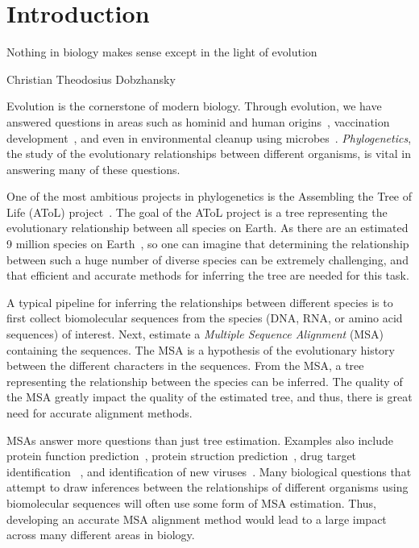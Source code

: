 \chapter{Introduction}\label{intro}
%
\epigraph{Nothing in biology makes sense except in the light of evolution}{Christian Theodosius Dobzhansky}

Evolution is the cornerstone of modern biology.  Through evolution, we have answered questions in areas such as hominid and human origins~\cite{Martin1990,Takahata1997}, vaccination development~\cite{Wilder-Smith2010,Fitch1993}, and even in environmental cleanup using microbes~\cite{Liu1993}.  \emph{Phylogenetics}, the study of the evolutionary relationships between different organisms, is vital in answering many of these questions.  

One of the most ambitious projects in phylogenetics is the Assembling the Tree of Life (AToL) project~\cite{atol-website}.  The goal of the AToL project is a tree representing the evolutionary relationship between all species on Earth.  As there are an estimated 9 million species on Earth~\cite{Mora2011}, so one can imagine that determining the relationship between such a huge number of diverse species can be extremely challenging, and that efficient and accurate methods for inferring the tree are needed for this task.  

A typical pipeline for inferring the relationships between different species is to first collect biomolecular sequences from the species (DNA, RNA, or amino acid sequences) of interest.  Next, estimate a \emph{Multiple Sequence Alignment} (MSA) containing the sequences.  The MSA is a hypothesis of the evolutionary history between the different characters in the sequences.  From the MSA, a tree representing the relationship between the species can be inferred.  The quality of the MSA greatly impact the quality of the estimated tree, and thus, there is great need for accurate alignment methods.

MSAs answer more questions than just tree estimation.  Examples also include protein function prediction~\cite{Pei2008}, protein struction prediction~\cite{todo}, drug target identification~ \cite{Abadio2011}, and identification of new viruses~\cite{todo}.  Many biological questions that attempt to draw inferences between the relationships of different organisms using biomolecular sequences will often use some form of MSA estimation. Thus, developing an accurate MSA alignment method would lead to a large impact across many different areas in biology.

